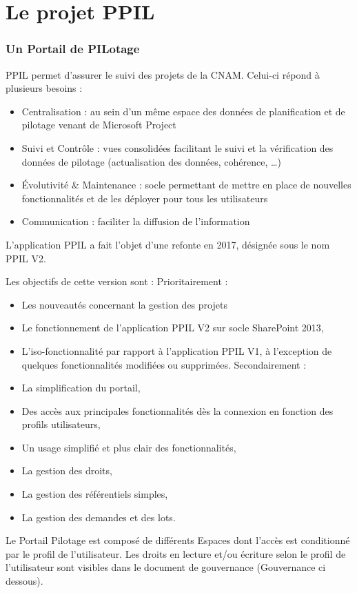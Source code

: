 \section{Le projet PPIL}
\subsubsection{Un Portail de PILotage}
PPIL permet d'assurer le suivi des projets de la CNAM.
Celui-ci répond à plusieurs besoins :
\begin{itemize}
    \item Centralisation : au sein d’un même espace des données de planification et de pilotage venant de Microsoft Project
    \item Suivi et Contrôle : vues consolidées facilitant le suivi et la vérification des données de pilotage (actualisation des données, cohérence, …)
    \item Évolutivité & Maintenance : socle permettant de mettre en place de nouvelles fonctionnalités et de les déployer pour tous les utilisateurs
    \item Communication : faciliter la diffusion de l’information
\end{itemize}
L'application PPIL a fait l'objet d'une refonte en 2017, désignée sous le nom PPIL V2. 

Les objectifs de cette version sont :
Prioritairement :
\begin{itemize}
    \item Les nouveautés concernant la gestion des projets
    \item Le fonctionnement de l’application PPIL V2 sur socle SharePoint 2013,
    \item L’iso-fonctionnalité par rapport à l’application PPIL V1, à l’exception de quelques fonctionnalités modifiées ou supprimées.
Secondairement :
    \item La simplification du portail,
    \item Des accès aux principales fonctionnalités dès la connexion en fonction des profils utilisateurs,
    \item Un usage simplifié et plus clair des fonctionnalités,
    \item La gestion des droits,
    \item La gestion des référentiels simples,
    \item La gestion des demandes et des lots.
\end{itemize}

Le Portail Pilotage est composé de différents Espaces dont l’accès est conditionné par le profil de l’utilisateur.
Les droits en lecture et/ou écriture selon le profil de l’utilisateur sont visibles dans le document de gouvernance (Gouvernance ci dessous).

